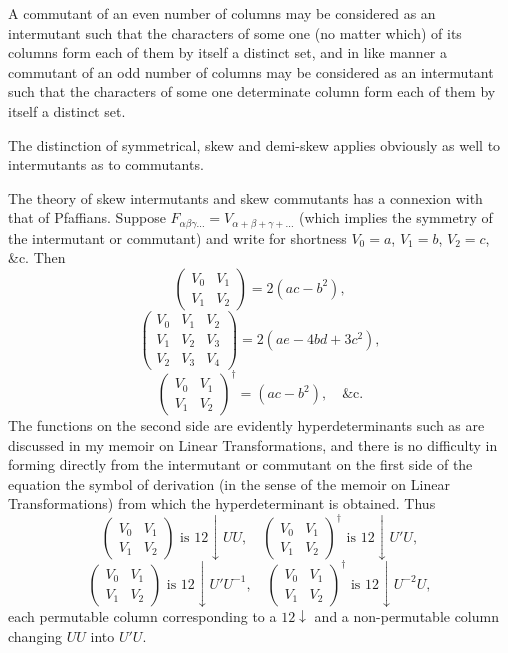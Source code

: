 \documentclass[11pt,a4paper]{book}
\begin{document}
A commutant of an even number of columns may be considered as an intermutant such that the characters of some one (no matter which) of its columns form each of them by itself a distinct set, and in like manner a commutant of an odd number of columns may be considered as an intermutant such that the characters of some one determinate column form each of them by itself a distinct set.

The distinction of symmetrical, skew and demi-skew applies obviously as well to intermutants as to commutants.

The theory of skew intermutants and skew commutants has a connexion with that of Pfaffians. Suppose $F_{\alpha\beta\gamma\ldots} = V_{\alpha+\beta+\gamma+\ldots}$ (which implies the symmetry of the intermutant or commutant) and write for shortness $V_0 = a$, $V_1 = b$, $V_2 = c$, \&c. Then
\[\begin{pmatrix} V_0 & V_1 \\ V_1 & V_2 \end{pmatrix} = 2(ac - b^2),\]
\[\begin{pmatrix} V_0 & V_1 & V_2 \\ V_1 & V_2 & V_3 \\ V_2 & V_3 & V_4 \end{pmatrix} = 2(ae - 4bd + 3c^2),\]
\[\begin{pmatrix} V_0 & V_1 \\ V_1 & V_2 \end{pmatrix}^{\dagger} = (ac - b^2), \quad \&\text{c.}\]
The functions on the second side are evidently hyperdeterminants such as are discussed in my memoir on Linear Transformations, and there is no difficulty in forming directly from the intermutant or commutant on the first side of the equation the symbol of derivation (in the sense of the memoir on Linear Transformations) from which the hyperdeterminant is obtained. Thus
\[\begin{pmatrix} V_0 & V_1 \\ V_1 & V_2 \end{pmatrix} \text{ is } 12\downarrow UU, \quad \begin{pmatrix} V_0 & V_1 \\ V_1 & V_2 \end{pmatrix}^{\dagger} \text{ is } 12\downarrow U'U,\]
\[\begin{pmatrix} V_0 & V_1 \\ V_1 & V_2 \end{pmatrix} \text{ is } 12\downarrow U'U^{-1}, \quad \begin{pmatrix} V_0 & V_1 \\ V_1 & V_2 \end{pmatrix}^{\dagger} \text{ is } 12\downarrow U^{-2}U,\]
each permutable column corresponding to a $12\downarrow$ and a non-permutable column changing $UU$ into $U'U$.
\end{document}
